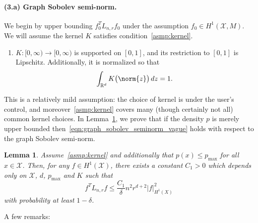 \documentclass{article}
\newcommand{\Reals}{\mathbb{R}}
\newcommand{\1}{\mathbf{1}}
\newcommand{\Lap}{L}
\newcommand{\Xset}{\mathcal{X}}
\theoremstyle{alden}
\theoremstyle{aldenthm}
\newtheorem{lemma}{Lemma}
\theoremstyle{definition}
\theoremstyle{remark}
\begin{document}
\paragraph{(3.a) Graph Sobolev semi-norm.}
We begin by upper bounding $f_0^T \Lap_{n,r} f_0$ under the assumption $f_0 \in H^1(\Xset,M)$. We will assume the kernel $K$ satisfies condition~\ref{asmp:kernel}.
\begin{enumerate}[label=(K\arabic*)]
	\item
	\label{asmp:kernel}
	$K:[0,\infty) \to [0,\infty)$ is supported on $[0,1]$, and its restriction to $[0,1]$ is Lipschitz. Additionally, it is normalized so that
	\begin{equation*}
	\int_{\Reals^d} K\bigl(\norm{z}\bigr) \,dz = 1.
	\end{equation*}
\end{enumerate}
This is a relatively mild assumption: the choice of kernel is under the user's control, and moreover~\ref{asmp:kernel} covers many (though certainly not all) common kernel choices. In Lemma~\ref{lem:graph_sobolev_seminorm}, we prove that if the density $p$ is merely upper bounded then~\eqref{eqn:graph_sobolev_seminorm_vague} holds with respect to the graph Sobolev semi-norm.
\begin{lemma}
	\label{lem:graph_sobolev_seminorm}
	Assume~\ref{asmp:kernel} and additionally that $p(x) \leq p_{\max}$ for all $x \in \Xset$. Then, for any $f \in H^1(\Xset)$, there exists a constant $C_1 > 0$ which depends only on $\Xset$, $d$, $p_{\max}$ and $K$ such that
	\begin{equation}
	\label{eqn:graph_sobolev_seminorm}
	f^T \Lap_{n,r} f \leq \frac{C_1}{\delta} n^2 r^{d + 2} |f|_{H^1(X)}^2
	\end{equation}
	with probability at least $1 - \delta$.
\end{lemma}
A few remarks:
\end{document}

